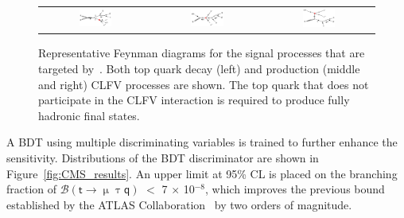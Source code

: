 \begin{figure}[tbh!]
 \begin{center}
 \begin{tabular}{ccc}
 \includegraphics[width=0.31\textwidth]{figures/Part3/History/CMS_TT}&
 \includegraphics[width=0.33\textwidth]{figures/Part3/History/CMS_ST1}&
 \includegraphics[width=0.31\textwidth]{figures/Part3/History/CMS_ST2}\\
 \end{tabular}
 \caption{Representative Feynman diagrams for the signal processes that are targeted by~\cite{CMS:2022ztx}. Both top quark decay (left) and production (middle and right) \ac{CLFV} processes are shown. The top quark that does not participate in the \ac{CLFV} interaction is required to produce fully hadronic final states.}
 \label{fig:CMS_FD}
 \end{center}
 \end{figure}
 
A \ac{BDT} using multiple discriminating variables is trained to further enhance the sensitivity. Distributions of the \ac{BDT} discriminator are shown in Figure~\ref{fig:CMS_results}. An upper limit at 95\% \ac{CL} is placed on the branching fraction of $\mathcal{B}(\textsf{t}\rightarrow\upmu\uptau\textsf{q})$ $<$ 7 $\times$ 10$^{-8}$, which improves the previous bound established by the \ac{ATLAS} Collaboration~\cite{ATLAS-CONF-2018-044} by two orders of magnitude.
 
